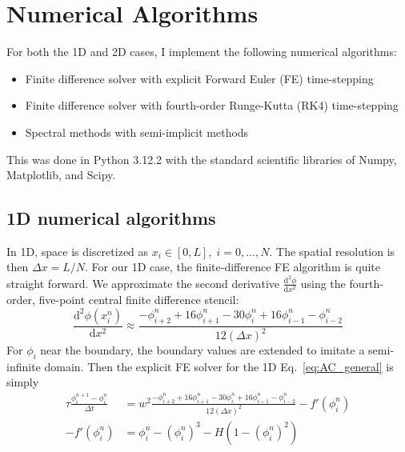\documentclass[12pt]{article}
\newcommand{\refeq}[1]{Eq.~\eqref{#1}}
\newcommand{\diff}{\mathrm{d}}
\providecommand*{\deriv}[3][]{\frac{\diff^{#1}#2}{\diff #3^{#1}}}
\newcommand{\dx}{\Delta x}
\newcommand{\dt}{\Delta t}
\begin{document}
\section{Numerical Algorithms}
For both the 1D and 2D cases, I implement the following numerical algorithms:
\begin{itemize}
    \item Finite difference solver with explicit Forward Euler (FE) time-stepping
    \item Finite difference solver with fourth-order Runge-Kutta (RK4) time-stepping
    \item Spectral methods with semi-implicit methods
\end{itemize}
This was done in Python 3.12.2 with the standard scientific libraries of Numpy, Matplotlib, and Scipy.
\subsection{1D numerical algorithms}
In 1D, space is discretized as $x_i \in [0, L], \; i=0,\dots,N$.
The spatial resolution is then $\dx = L / N$.
For our 1D case, the finite-difference FE algorithm is quite straight forward.
We approximate the second derivative $\deriv[2]{\phi}{x}$ using the fourth-order, five-point central finite difference stencil:
\begin{equation}
    \deriv[2]{\phi(x_i^n)}{x} \approx \frac{-\phi_{i+2}^n+16\phi_{i+1}^n-30\phi_{i}^n+16\phi_{i-1}^n - \phi_{i-2}^n}{12(\dx)^2}
    \label{eq:1d_lap}
\end{equation}
For $\phi_i$ near the boundary, the boundary values are extended to imitate a semi-infinite domain.
Then the explicit FE solver for the 1D \refeq{eq:AC_general} is simply
\begin{align}
    \tau \frac{\phi_i^{n+1} - \phi_i^n}{\dt} &= w^2 \frac{-\phi_{i+2}^n+16\phi_{i+1}^n-30\phi_{i}^n+16\phi_{i-1}^n - \phi_{i-2}^n}{12(\dx)^2} - f'(\phi_i^n) \label{eq:1d_FE} \\
    -f'(\phi_i^n) &= \phi_i^n - (\phi_i^n)^3 - H(1-(\phi_i^n)^2) \label{eq:bulk_deriv}
\end{align}
\end{document}
